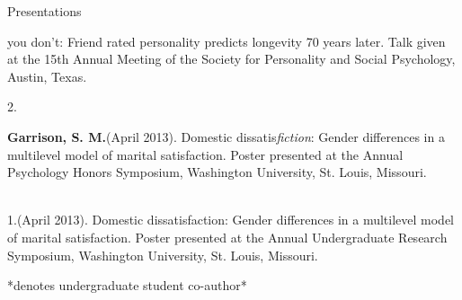 \documentclass {resume}
\newcommand{\meb}{{\bf Garrison, S. M.}\xspace}
\begin{document}
\begin{rSection}{\textrm{Presentations}}
\begin{samepage}
\hspace* {6 mm}you don't: Friend rated personality predicts longevity 70 years later. Talk given at the 15th Annual Meeting \hspace* {6 mm}of the Society for Personality and  Social Psychology, Austin, Texas. \smallskip\\\end{samepage}
2.\hspace* {2.5 mm}\begin{samepage}\meb (April 2013). Domestic dissatis{\em fiction}: Gender differences in a multilevel model of marital \hspace* {6 mm}satisfaction. Poster presented at the Annual Psychology Honors Symposium, Washington  University, St. Louis, \hspace* {6 mm}Missouri.\end{samepage}\smallskip\\
1.\hspace* {2.5 mm}\meb (April 2013). Domestic dissatisfaction: Gender differences in a multilevel model of marital \hspace* {6 mm}satisfaction. Poster presented at the Annual Undergraduate Research Symposium, Washington University, St. \hspace* {6 mm}Louis, Missouri.\vspace{-2mm}\begin{center}\footnotesize{*denotes undergraduate student co-author*}\end{center} \vspace{-4mm}
\end{rSection}
\end{document}
